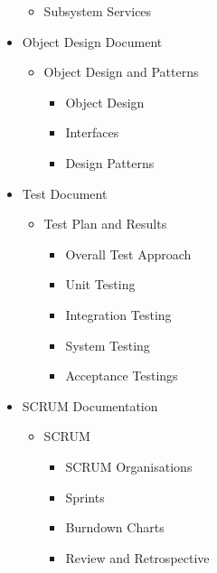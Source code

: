 \begin{itemize}
\begin{itemize}
	\item Subsystem Services
	\end{itemize}

	\item Object Design Document
	\begin{itemize}
		\item Object Design and Patterns
		\begin{itemize}
			\item Object Design
			\item Interfaces
			\item Design Patterns
		\end{itemize}
	\end{itemize}

	\item Test Document
	\begin{itemize}
		\item Test Plan and Results
		\begin{itemize}
			\item Overall Test Approach
			\item Unit Testing
			\item Integration Testing
			\item System Testing
			\item Acceptance Testings
		\end{itemize}
	\end{itemize}

	\item SCRUM Documentation
	\begin{itemize}
		\item SCRUM
		\begin{itemize}
			\item SCRUM Organisations
			\item Sprints
			\item Burndown Charts
			\item Review and Retrospective
		\end{itemize}
	\end{itemize}
\end{itemize}